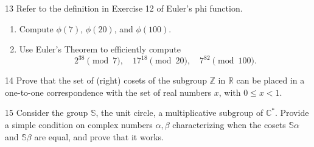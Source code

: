 \begin{problem}{13}
    Refer to the definition in Exercise 12 of Euler's phi function.
    \begin{enumerate}
        \item[(a)] Compute $\phi(7)$, $\phi(20)$, and $\phi(100)$.
        \item[(b)] Use Euler's Theorem to efficiently compute
        \[2^{38} \pmod{7}, \quad 17^{18} \pmod{20}, \quad 7^{82} \pmod{100}.\]
    \end{enumerate}
\end{problem}
\unsolved

\begin{problem}{14}
    Prove that the set of (right) cosets of the subgroup $\mathbb{Z}$ in $\mathbb{R}$ can
    be placed in a one-to-one correspondence with the set of real numbers $x$, with
    $0 \le x < 1$.
\end{problem}
\unsolved

\begin{problem}{15}
    Consider the group $\mathbb{S}$, the unit circle, a multiplicative subgroup of
    $\mathbb{C}^*$. Provide a simple condition on complex numbers $\alpha, \beta$
    characterizing when the cosets $\mathbb{S}\alpha$ and $\mathbb{S}\beta$ are equal, and
    prove that it works.
\end{problem}
\unsolved
